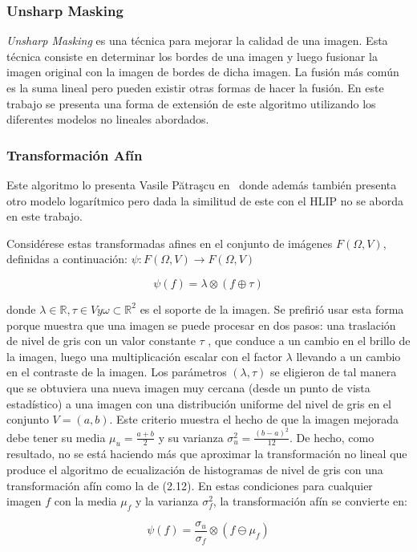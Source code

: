 \subsubsection{Unsharp Masking}

\textit{Unsharp Masking} es una t\'ecnica para mejorar la calidad de una imagen. Esta t\'ecnica consiste en determinar los bordes de una imagen y luego fusionar la imagen original con la imagen de bordes de dicha imagen. La fusi\'on m\'as com\'un es la suma lineal pero pueden existir otras formas de hacer la fusi\'on. En este trabajo se presenta una forma de extensi\'on de este algoritmo utilizando los diferentes modelos no lineales abordados.

\subsubsection{Transformaci\'on Af\'in}

Este algoritmo lo presenta Vasile Pătraşcu en~\cite{patrascu2003gray} donde adem\'as tambi\'en presenta otro modelo logar\'itmico pero dada la similitud de este con el HLIP no se aborda en este trabajo.

Consid\'erese estas transformadas afines en el conjunto de imágenes $F (\Omega, V)$, definidas a continuaci\'on: $\psi : F (\Omega, V ) \to F (\Omega, V )$

\begin{equation}
	\psi(f)=\lambda\otimes(f\oplus\tau)
\end{equation}

donde $\lambda \in \mathbb{R}, \tau \in V y \omega\subset\mathbb{R}^2$ es el soporte de la imagen. Se prefirió usar esta forma porque muestra que una imagen se puede procesar en dos pasos: una traslación de nivel de gris con un valor constante $\tau$ , que conduce a un cambio en el brillo de la imagen, luego una multiplicación escalar con el factor $\lambda$  llevando a un cambio en el contraste de la imagen. Los parámetros $(\lambda, \tau )$ se eligieron de tal manera que se obtuviera una nueva imagen muy cercana (desde un punto de vista estadístico) a una imagen con una distribución uniforme del nivel de gris en el conjunto $V=(a,b)$. Este criterio muestra
el hecho de que la imagen mejorada debe tener su media $\mu_u = \frac{a+b}{2}$ y su varianza $\sigma_u^2 = \frac{(b-a)^2}{12}$. De hecho, como resultado, no se est\'a haciendo más que aproximar la transformaci\'on no lineal que produce el algoritmo de ecualización de histogramas de nivel de gris con una transformaci\'on afín como la de (2.12). En estas condiciones para cualquier imagen $f$ con la media $\mu_f$ y la varianza $\sigma_f^2 $, la transformaci\'on afín  se convierte en:

\begin{equation}
	\psi(f)=\frac{\sigma_u}{\sigma_f}\otimes(f\ominus\mu_f)
\end{equation}